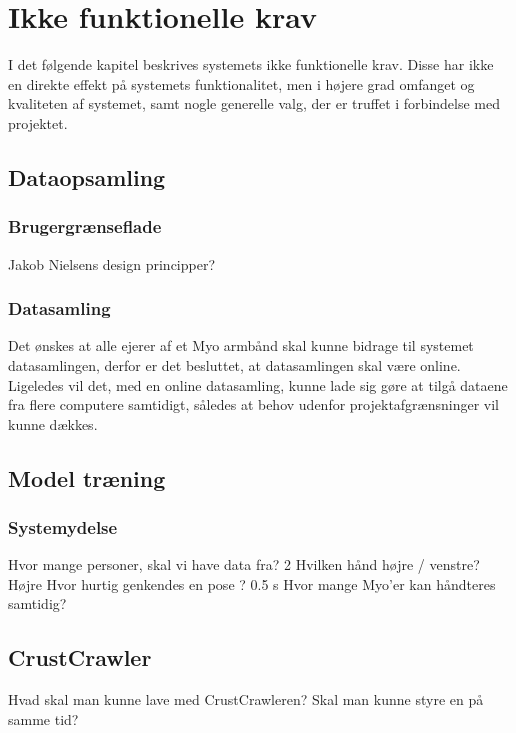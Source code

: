 \thispagestyle{fancy}
\chapter{Ikke funktionelle krav}
I det følgende kapitel beskrives systemets ikke funktionelle krav. Disse har ikke en direkte effekt på systemets funktionalitet, men i højere grad omfanget og kvaliteten af systemet, samt nogle generelle valg, der er truffet i forbindelse med projektet.

\section{Dataopsamling}

\subsection{Brugergrænseflade}
Jakob Nielsens design principper?

\subsection{Datasamling}
Det ønskes at alle ejerer af et Myo armbånd skal kunne bidrage til systemet datasamlingen, derfor er det besluttet, at datasamlingen skal være online. Ligeledes vil det, med en online datasamling, kunne lade sig gøre at tilgå dataene fra flere computere samtidigt, således at behov udenfor projektafgrænsninger vil kunne dækkes.

\section{Model træning}

\subsection{Systemydelse}
Hvor mange personer, skal vi have data fra? 2
Hvilken hånd højre / venstre? Højre
Hvor hurtig genkendes en pose ? 0.5 s
Hvor mange Myo'er kan håndteres samtidig?



\section{CrustCrawler}

Hvad skal man kunne lave med CrustCrawleren?
Skal man kunne styre en på samme tid?